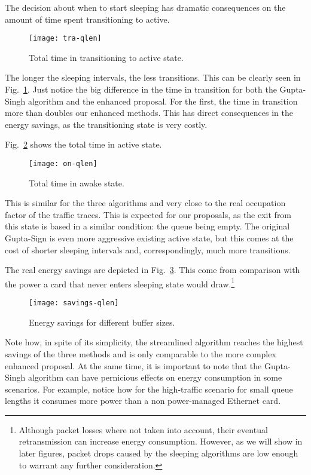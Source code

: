 \documentclass[conference,english]{IEEEtran}
\begin{document}
The decision about when to start sleeping has dramatic consequences on the
amount of time spent transitioning to active.
\begin{figure}
  \centering
  \texttt{[image: tra-qlen]}
  \caption{Total time in transitioning to active state.}
  \label{fig:tra-time}
\end{figure}
The longer the sleeping intervals, the less transitions. This can be clearly
seen in Fig.~\ref{fig:tra-time}. Just notice the big difference in the time in
transition for both the Gupta-Singh algorithm and the enhanced proposal. For
the first, the time in transition more than doubles our enhanced methods. This
has direct consequences in the energy savings, as the transitioning state is
very costly.

Fig.~\ref{fig:on-time} shows the total time in active state.
\begin{figure}
  \centering
  \texttt{[image: on-qlen]}
  \caption{Total time in awake state.}
  \label{fig:on-time}
\end{figure}
This is similar for the three algorithms and very close to the real occupation
factor of the traffic traces. This is expected for our proposals, as the exit
from this state is based in a similar condition: the queue being empty. The
original Gupta-Sign is even more aggressive existing active state, but this
comes at the cost of shorter sleeping intervals and, correspondingly, much
more transitions.

The real energy savings are depicted in Fig.~\ref{fig:savings}. This come from
comparison with the power a card that never enters sleeping state would
draw.\footnote{Although packet losses where not taken into account, their
  eventual retransmission can increase energy consumption. However, as we will
  show in later figures, packet drops caused by the sleeping algorithms are
  low enough to warrant any further consideration.}
\begin{figure}
  \centering
  \texttt{[image: savings-qlen]}
  \caption{Energy savings for different buffer sizes.}
  \label{fig:savings}
\end{figure}
Note how, in spite of its simplicity, the streamlined algorithm reaches the
highest savings of the three methods and is only comparable to the more
complex enhanced proposal. At the same time, it is important to note that the
Gupta-Singh algorithm can have pernicious effects on energy consumption in
some scenarios. For example, notice how for the high-traffic scenario for
small queue lengths it consumes more power than a non power-managed Ethernet
card.
\end{document}
